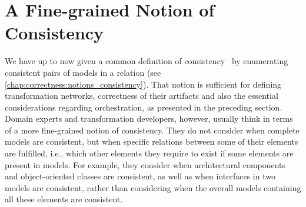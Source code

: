 \section{A Fine-grained Notion of Consistency}
\label{chap:correctness:finegrained}




We have up to now given a common definition of consistency~\cite{stevens2010sosym} by enumerating consistent pairs of models in a relation (see \autoref{chap:correctness:notions_consistency}).
That notion is sufficient for defining transformation networks, correctness of their artifacts and also the essential considerations regarding orchestration, as presented in the preceding section.
Domain experts and transformation developers, however, usually think in terms of a more fine-grained notion of consistency.
They do not consider when complete models are consistent, but when specific relations between some of their elements are fulfilled, i.e., which other elements they require to exist if some elements are present in models.
For example, they consider when architectural components and object-oriented classes are consistent, as well as when interfaces in two models are consistent, rather than considering when the overall models containing all these elements are consistent.

